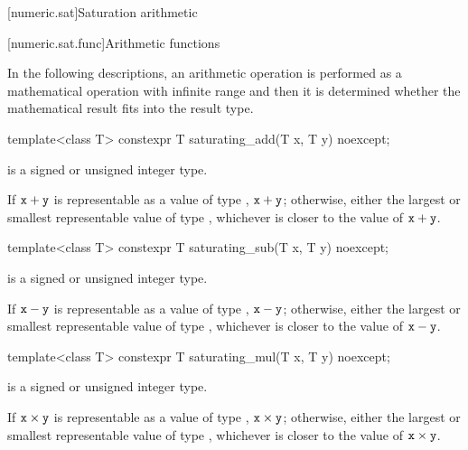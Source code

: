[numeric.sat]{Saturation arithmetic}

[numeric.sat.func]{Arithmetic functions}

\pnum
In the following descriptions, an arithmetic operation
is performed as a mathematical operation with infinite range and then
it is determined whether the mathematical result fits into the result type.

%
\begin{itemdecl}
template<class T>
  constexpr T saturating_add(T x, T y) noexcept;
\end{itemdecl}

\begin{itemdescr}
\pnum
\constraints
{} is a signed or unsigned integer type.

\pnum
\returns
If $\tcode{x} + \tcode{y}$ is representable as a value of type , $\tcode{x} + \tcode{y}$;
otherwise, either the largest or smallest representable value of type ,
whichever is closer to the value of $\tcode{x} + \tcode{y}$.
\end{itemdescr}

%
\begin{itemdecl}
template<class T>
  constexpr T saturating_sub(T x, T y) noexcept;
\end{itemdecl}

\begin{itemdescr}
\pnum
\constraints
{} is a signed or unsigned integer type.

\pnum
\returns
If $\tcode{x} - \tcode{y}$ is representable as a value of type , $\tcode{x} - \tcode{y}$;
otherwise, either the largest or smallest representable value of type ,
whichever is closer to the value of $\tcode{x} - \tcode{y}$.
\end{itemdescr}

%
\begin{itemdecl}
template<class T>
  constexpr T saturating_mul(T x, T y) noexcept;
\end{itemdecl}

\begin{itemdescr}
\pnum
\constraints
{} is a signed or unsigned integer type.

\pnum
\returns
If $\tcode{x} \times \tcode{y}$ is representable as a value of type , $\tcode{x} \times \tcode{y}$;
otherwise, either the largest or smallest representable value of type ,
whichever is closer to the value of $\tcode{x} \times \tcode{y}$.
\end{itemdescr}

